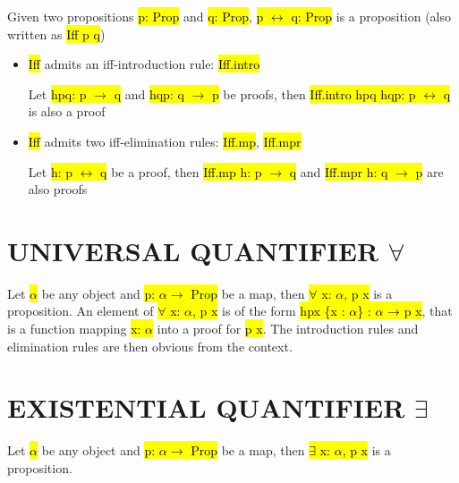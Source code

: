 Given two propositions \hl{p: Prop} and \hl{q: Prop}, \hl{p $\leftrightarrow$ q: Prop} is a proposition (also written as \hl{Iff p q})

\begin{itemize}
	\item \hl{Iff} admits an iff-introduction rule: \hl{Iff.intro}
	
	Let \hl{hpq: p $\to$ q} and \hl{hqp: q $\to$ p} be proofs, then  \hl{Iff.intro hpq hqp: p $\leftrightarrow$ q} is also a proof
	
	\item \hl{Iff} admits two iff-elimination rules: \hl{Iff.mp}, \hl{Iff.mpr}
	
	
	Let \hl{h: p $\leftrightarrow$ q} be a proof, then \hl{Iff.mp h: p $\to$ q} and \hl{Iff.mpr h: q $\to$ p} are also proofs
\end{itemize}

\begin{center}
\end{center}

\section{UNIVERSAL QUANTIFIER $\forall$}

Let \hl{$\alpha$} be any object and \hl{p: $\alpha \to$ Prop} be a map, then \hl{$\forall$ x: $\alpha$, p x} is a proposition. An element of \hl{$\forall$ x: $\alpha$, p x} is of the form \hl{hpx \{x : $\alpha$\} : $\alpha$ → p x}, that is a function mapping \hl{x: $\alpha$} into a proof for \hl{p x}. The introduction rules and elimination rules are then obvious from the context.

\section{EXISTENTIAL QUANTIFIER $\exists$}

Let \hl{$\alpha$} be any object and \hl{p: $\alpha \to$ Prop} be a map, then \hl{$\exists$ x: $\alpha$, p x} is a proposition.

